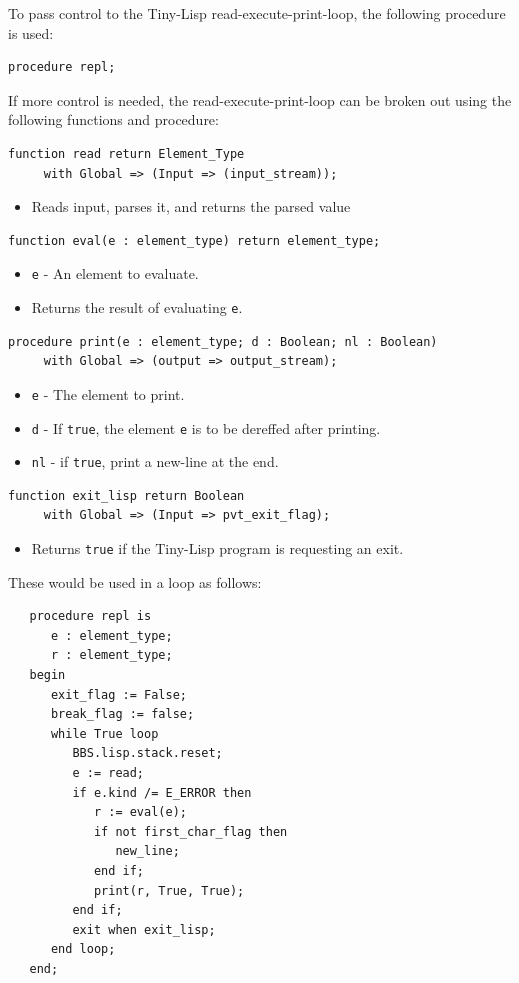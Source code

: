 \documentclass[10pt, openany]{book}
\newcommand{\keyword}[1]{\texttt{#1}}
\newcommand{\tl}{Tiny-Lisp}
\begin{document}
To pass control to the \tl{} read-execute-print-loop, the following procedure is used:
\begin{lstlisting}
procedure repl;
\end{lstlisting}
If more control is needed, the read-execute-print-loop can be broken out using the following functions and procedure:
\begin{lstlisting}
function read return Element_Type
     with Global => (Input => (input_stream));
\end{lstlisting}
\begin{itemize}
  \item Reads input, parses it, and returns the parsed value
\end{itemize}
\begin{lstlisting}
function eval(e : element_type) return element_type;
\end{lstlisting}
\begin{itemize}
  \item \keyword{e} - An element to evaluate.
  \item Returns the result of evaluating \keyword{e}.
\end{itemize}
\begin{lstlisting}
procedure print(e : element_type; d : Boolean; nl : Boolean)
     with Global => (output => output_stream);
\end{lstlisting}
\begin{itemize}
  \item \keyword{e} - The element to print.
  \item \keyword{d} - If \keyword{true}, the element \keyword{e} is to be dereffed after printing.
  \item \keyword{nl} - if \keyword{true}, print a new-line at the end.
\end{itemize}
\begin{lstlisting}
function exit_lisp return Boolean
     with Global => (Input => pvt_exit_flag);
\end{lstlisting}
\begin{itemize}
  \item Returns \keyword{true} if the \tl{} program is requesting an exit.
\end{itemize}
These would be used in a loop as follows:
\begin{lstlisting}
   procedure repl is
      e : element_type;
      r : element_type;
   begin
      exit_flag := False;
      break_flag := false;
      while True loop
         BBS.lisp.stack.reset;
         e := read;
         if e.kind /= E_ERROR then
            r := eval(e);
            if not first_char_flag then
               new_line;
            end if;
            print(r, True, True);
         end if;
         exit when exit_lisp;
      end loop;
   end;
\end{lstlisting}
\end{document}

